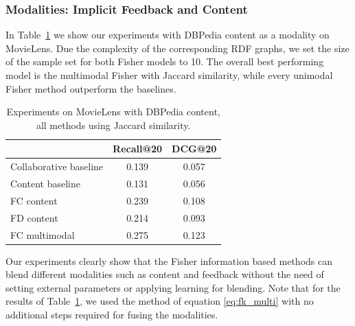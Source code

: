 \subsubsection{Modalities: Implicit Feedback and Content} 
In Table~\ref{tab:exp_content} we show our experiments with DBPedia content as a modality on MovieLens. Due the complexity of the corresponding RDF graphs, we set the size of the sample set for both Fisher models to 10. 
The overall best performing model is the multimodal Fisher with Jaccard similarity, while every unimodal Fisher method outperform the baselines. 

\begin{table} 
\caption[]{Experiments on MovieLens with DBPedia content, all methods using Jaccard similarity.  
}
\centering
    \begin{tabular}{lcc}
			& Recall@20 	& DCG@20 \\ \hline
Collaborative baseline	& 0.139		& 0.057 \\
Content baseline      	& 0.131 	& 0.056 \\
FC content 		& 0.239 	& 0.108 \\
FD content		& 0.214 	& 0.093 \\
FC multimodal    	& 0.275 	& 0.123 \\ \hline 
    \end{tabular}
      \label{tab:exp_content}
\end{table}

Our experiments clearly show that the Fisher information based methods can blend different modalities such as content and feedback without the need of setting external parameters or applying learning for blending.  Note that for the results of Table~\ref{tab:exp_content}, we used the method of equation \eqref{eq:fk_multi} with no additional steps required for fusing the modalities.

